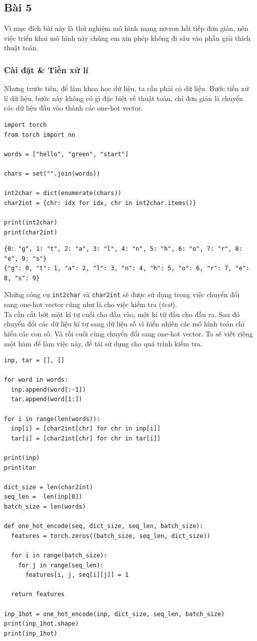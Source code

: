 \documentclass[a4paper]{article}
\begin{document}
\subsection{Bài 5}
Vì mục đích bài này là thử nghiệm mô hình mạng nơ-ron hồi tiếp đơn giản, nên việc triển khai mô hình này chúng em xin phép không đi sâu vào phần giải thích thuật toán.
\subsubsection{Cài đặt \& Tiền xử lí}
Nhưng trước tiên, để làm khoa học dữ liệu, ta cần phải có dữ liệu. Bước tiền xử lí dữ liệu, bước này không có gì đặc biệt về thuật toán, chỉ đơn giản là chuyển các dữ liệu đầu vào thành các one-hot vector.
\begin{lstlisting}
import torch
from torch import nn

words = ["hello", "green", "start"]

chars = set("".join(words))

int2char = dict(enumerate(chars))
char2int = {chr: idx for idx, chr in int2char.items()}

print(int2char)
print(char2int)
\end{lstlisting}
\begin{verbatim}
{0: "g", 1: "t", 2: "a", 3: "l", 4: "n", 5: "h", 6: "o", 7: "r", 8: "e", 9: "s"}
{"g": 0, "t": 1, "a": 2, "l": 3, "n": 4, "h": 5, "o": 6, "r": 7, "e": 8, "s": 9}
\end{verbatim}
Những công cụ \texttt{int2char} và \texttt{char2int} sẽ được sử dụng trong việc chuyển đổi sang one-hot vector cũng như là cho việc kiểm tra (\textit{test}).\\
Ta cần cắt bớt một kí tự cuối cho đầu vào, một kí từ đầu cho đầu ra. Sau đó chuyển đổi các dữ liệu kí tự sang dữ liệu số vì hiển nhiên các mô hình toán chỉ hiểu các con số. Và rồi cuối cùng chuyển đổi sang one-hot vector. Ta sẽ viết riêng một hàm để làm việc này, để tái sử dụng cho quá trình kiểm tra.
\begin{lstlisting}
inp, tar = [], []

for word in words:
  inp.append(word[:-1])
  tar.append(word[1:])

for i in range(len(words)):
  inp[i] = [char2int[chr] for chr in inp[i]]
  tar[i] = [char2int[chr] for chr in tar[i]]

print(inp)
print(tar

dict_size = len(char2int)
seq_len =  len(inp[0])
batch_size = len(words)

def one_hot_encode(seq, dict_size, seq_len, batch_size):
  features = torch.zeros((batch_size, seq_len, dict_size))

  for i in range(batch_size):
    for j in range(seq_len):
      features[i, j, seq[i][j]] = 1

  return features
  
inp_1hot = one_hot_encode(inp, dict_size, seq_len, batch_size)
print(inp_1hot.shape)
print(inp_1hot)
\end{lstlisting}
\end{document}
